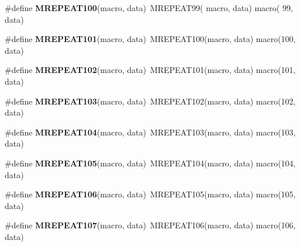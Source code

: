 \begin{DoxyCompactItemize}
\item 
\hypertarget{group__group__sam0__utils__mrepeat_ga2735125552e869ea1e49fa52ed6e175c}{}\#define {\bfseries M\+R\+E\+P\+E\+A\+T100}(macro,  data)~M\+R\+E\+P\+E\+A\+T99( macro, data)   macro( 99, data)\label{group__group__sam0__utils__mrepeat_ga2735125552e869ea1e49fa52ed6e175c}

\item 
\hypertarget{group__group__sam0__utils__mrepeat_gae02508a50d4516010d562970b2466731}{}\#define {\bfseries M\+R\+E\+P\+E\+A\+T101}(macro,  data)~M\+R\+E\+P\+E\+A\+T100(macro, data)   macro(100, data)\label{group__group__sam0__utils__mrepeat_gae02508a50d4516010d562970b2466731}

\item 
\hypertarget{group__group__sam0__utils__mrepeat_ga2418759d7f3f1ae57feab4b703f99662}{}\#define {\bfseries M\+R\+E\+P\+E\+A\+T102}(macro,  data)~M\+R\+E\+P\+E\+A\+T101(macro, data)   macro(101, data)\label{group__group__sam0__utils__mrepeat_ga2418759d7f3f1ae57feab4b703f99662}

\item 
\hypertarget{group__group__sam0__utils__mrepeat_ga5497848f0c9b8f33dbbad94bb98a8a8b}{}\#define {\bfseries M\+R\+E\+P\+E\+A\+T103}(macro,  data)~M\+R\+E\+P\+E\+A\+T102(macro, data)   macro(102, data)\label{group__group__sam0__utils__mrepeat_ga5497848f0c9b8f33dbbad94bb98a8a8b}

\item 
\hypertarget{group__group__sam0__utils__mrepeat_ga22151fc326d5feb28b754cbc581902e1}{}\#define {\bfseries M\+R\+E\+P\+E\+A\+T104}(macro,  data)~M\+R\+E\+P\+E\+A\+T103(macro, data)   macro(103, data)\label{group__group__sam0__utils__mrepeat_ga22151fc326d5feb28b754cbc581902e1}

\item 
\hypertarget{group__group__sam0__utils__mrepeat_ga8df0585384d0052a9a2009876cd18459}{}\#define {\bfseries M\+R\+E\+P\+E\+A\+T105}(macro,  data)~M\+R\+E\+P\+E\+A\+T104(macro, data)   macro(104, data)\label{group__group__sam0__utils__mrepeat_ga8df0585384d0052a9a2009876cd18459}

\item 
\hypertarget{group__group__sam0__utils__mrepeat_ga65c66d814f582f426c18794de01f4475}{}\#define {\bfseries M\+R\+E\+P\+E\+A\+T106}(macro,  data)~M\+R\+E\+P\+E\+A\+T105(macro, data)   macro(105, data)\label{group__group__sam0__utils__mrepeat_ga65c66d814f582f426c18794de01f4475}

\item 
\hypertarget{group__group__sam0__utils__mrepeat_ga0cddcc3fa390ae9e30eaf07e9223be42}{}\#define {\bfseries M\+R\+E\+P\+E\+A\+T107}(macro,  data)~M\+R\+E\+P\+E\+A\+T106(macro, data)   macro(106, data)\label{group__group__sam0__utils__mrepeat_ga0cddcc3fa390ae9e30eaf07e9223be42}


\end{DoxyCompactItemize}
